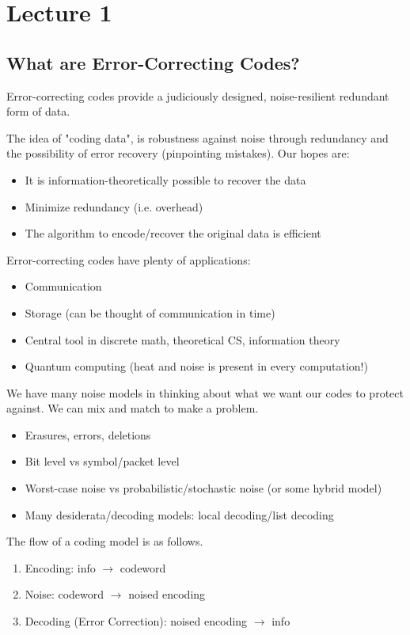 \section{Lecture 1}

\subsection{What are Error-Correcting Codes?}

Error-correcting codes provide a judiciously designed, noise-resilient redundant form of data.

The idea of "coding data", is robustness against noise through redundancy and the possibility of error recovery (pinpointing mistakes).
Our hopes are:
\begin{itemize}
    \item It is information-theoretically possible to recover the data
    \item Minimize redundancy (i.e. overhead)
    \item The algorithm to encode/recover the original data is efficient
\end{itemize}

Error-correcting codes have plenty of applications:
\begin{itemize}
    \item Communication
    \item Storage (can be thought of communication in time)
    \item Central tool in discrete math, theoretical CS, information theory
    \item Quantum computing (heat and noise is present in every computation!)
\end{itemize}

We have many noise models in thinking about what we want our codes to protect against. We can mix and match to make a problem.
\begin{itemize}
    \item Erasures, errors, deletions
    \item Bit level vs symbol/packet level
    \item Worst-case noise vs probabilistic/stochastic noise (or some hybrid model)
    \item Many desiderata/decoding models: local decoding/list decoding
\end{itemize}

The flow of a coding model is as follows.
\begin{enumerate}
    \item Encoding: info $\to$ codeword
    \item Noise: codeword $\to$ noised encoding
    \item Decoding (Error Correction): noised encoding $\to$ info
\end{enumerate}

